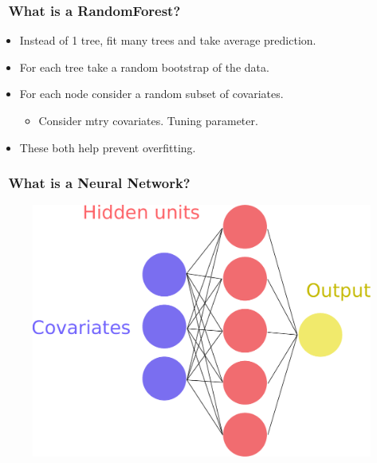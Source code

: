 \documentclass[handout, aspectratio = 169]{beamer}
\begin{document}
\begin{frame}
\frametitle{\insertframenumber~What is a RandomForest?}

\begin{itemize}
\item Instead of 1 tree, fit many trees and take average prediction.
\item For each tree take a random bootstrap of the data.
\item For each node consider a random subset of covariates.
	\begin{itemize}
	\item Consider mtry covariates. Tuning parameter.
	\end{itemize}
\item These both help prevent overfitting.
\end{itemize}
\end{frame} 


\begin{frame}
\frametitle{\insertframenumber~What is a Neural Network?}

\vspace{6mm}
\begin{figure}
    \includegraphics[height = 0.7\textheight]{neural_network.pdf}
\end{figure} 
\end{frame} 
\end{document}
